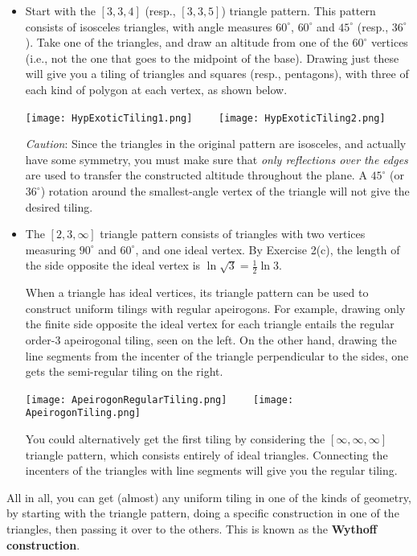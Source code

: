 \documentclass[leqno]{book}
\begin{document}
\begin{itemize}
\item Start with the $[3,3,4]$ (resp., $[3,3,5]$) triangle pattern.  This pattern consists of isosceles triangles, with angle measures $60^\circ$, $60^\circ$ and $45^\circ$ (resp., $36^\circ$).  Take one of the triangles, and draw an altitude from one of the $60^\circ$ vertices (i.e., not the one that goes to the midpoint of the base).  Drawing just these will give you a tiling of triangles and squares (resp., pentagons), with three of each kind of polygon at each vertex, as shown below.
\begin{center}
\texttt{[image: HypExoticTiling1.png]}~~~~
\texttt{[image: HypExoticTiling2.png]}
\end{center}
\emph{Caution}: Since the triangles in the original pattern are isosceles, and actually have some symmetry, you must make sure that \emph{only reflections over the edges} are used to transfer the constructed altitude throughout the plane.  A $45^\circ$ (or $36^\circ$) rotation around the smallest-angle vertex of the triangle will not give the desired tiling.

\item The $[2,3,\infty]$ triangle pattern consists of triangles with two vertices measuring $90^\circ$ and $60^\circ$, and one ideal vertex.  By Exercise 2(c), the length of the side opposite the ideal vertex is $\ln\sqrt 3=\frac 12\ln 3$.

When a triangle has ideal vertices, its triangle pattern can be used to construct uniform tilings with regular apeirogons.  For example, drawing only the finite side opposite the ideal vertex for each triangle entails the regular order-3 apeirogonal tiling, seen on the left.  On the other hand, drawing the line segments from the incenter of the triangle perpendicular to the sides, one gets the semi-regular tiling on the right.
\begin{center}
\texttt{[image: ApeirogonRegularTiling.png]}~~~~
\texttt{[image: ApeirogonTiling.png]}
\end{center}
You could alternatively get the first tiling by considering the $[\infty,\infty,\infty]$ triangle pattern, which consists entirely of ideal triangles.  Connecting the incenters of the triangles with line segments will give you the regular tiling.
\end{itemize}
\noindent All in all, you can get (almost) any uniform tiling in one of the kinds of geometry, by starting with the triangle pattern, doing a specific construction in one of the triangles, then passing it over to the others.  This is known as the \textbf{Wythoff construction}.
\end{document}
